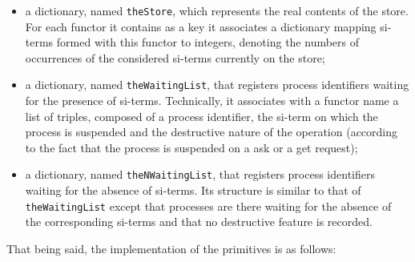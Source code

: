 \begin{sloppypar} 
\begin{itemize}

\item a dictionary, named \texttt{theStore}, which represents the real contents of the store. For each functor it contains as a key it associates a dictionary mapping si-terms formed with this functor to integers, denoting the numbers of occurrences of the considered si-terms currently on the store;

\item a dictionary, named \texttt{theWaitingList}, that registers process identifiers waiting for the presence of si-terms. Technically, it associates with a functor name a list of triples, composed of a process identifier, the si-term on which the process is suspended and the destructive nature of the operation (according to the fact that the process is suspended on a ask or a get request);

\item a dictionary, named \texttt{theNWaitingList}, that registers process identifiers waiting for the absence of si-terms. Its structure is similar to that of \texttt{theWaitingList} except that processes are there waiting for the absence of the corresponding si-terms and that no destructive feature is recorded.
\end{itemize} 
\end{sloppypar}

\noindent
That being said, the implementation of the primitives is as follows:

